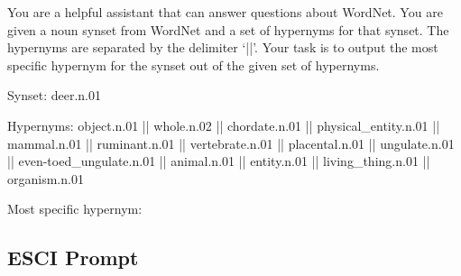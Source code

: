 \documentclass[11pt, a4paper, onecolumn, confidential, copyright, gdm]{google}
\begin{document}
\begin{tcolorbox}[promptbox]
\ttfamily
You are a helpful assistant that can answer questions about WordNet. You are given a noun synset from WordNet and a set of hypernyms for that synset. The hypernyms are separated by the delimiter `||'. Your task is to output the most specific hypernym for the synset out of the given set of hypernyms.

\vspace{0.5em} %

Synset:
deer.n.01

\vspace{0.5em} %

Hypernyms:
object.n.01 || whole.n.02 || chordate.n.01 || physical\_entity.n.01 || mammal.n.01 || ruminant.n.01 || vertebrate.n.01 || placental.n.01 || ungulate.n.01 || even-toed\_ungulate.n.01 || animal.n.01 || entity.n.01 || living\_thing.n.01 || organism.n.01

\vspace{0.5em} %

Most specific hypernym:
\end{tcolorbox}

\subsection{ESCI Prompt}\label{sec:esci-prompt}
\end{document}
